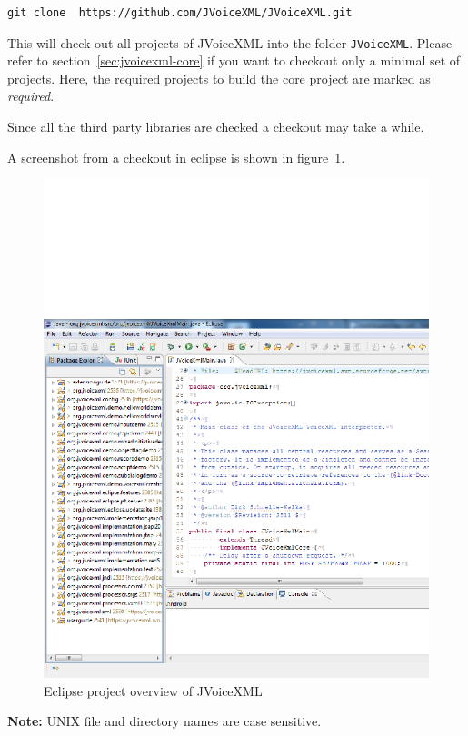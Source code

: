 \documentclass[11pt,a4paper]{article}
\begin{document}
\begin{lstlisting}
git clone  https://github.com/JVoiceXML/JVoiceXML.git
\end{lstlisting}

This will check out all projects of JVoiceXML
into the folder \texttt{JVoiceXML}. Please refer to
section~\ref{sec:jvoicexml-core} if you want to checkout
only a minimal set of projects. Here, the required projects
to build the core project are marked as \emph{required}.

Since all the third party libraries are checked a checkout may
take a while.

A screenshot from a checkout in eclipse is shown in
figure~\ref{fig:eclipse-projects}.
\begin{figure}
\includegraphics[width=\linewidth]{eclipse-projects.png}
\caption{Eclipse project overview of JVoiceXML}
\label{fig:eclipse-projects}
\end{figure}

\textbf{Note:} UNIX file and directory names are case sensitive.
\end{document}
